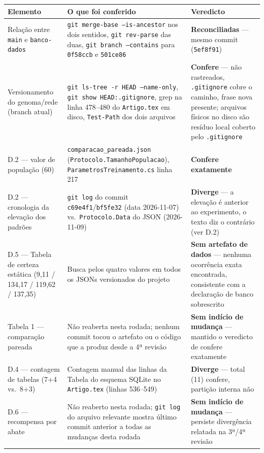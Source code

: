 \documentclass[11pt,a4paper]{article}
\begin{document}
\begin{longtable}{|p{3.6cm}|p{6.6cm}|p{4.4cm}|}
\hline
\textbf{Elemento} & \textbf{O que foi conferido} & \textbf{Veredicto} \\
\hline
\endhead
Relação entre \texttt{main} e \texttt{banco-dados} & \texttt{git merge-base --is-ancestor} nos dois
sentidos, \texttt{git rev-parse} das duas, \texttt{git branch --contains} para \texttt{0f58ccb} e
\texttt{501ce86} & \textbf{Reconciliadas} --- mesmo commit (\texttt{5ef8f91}) \\
\hline
Versionamento do genoma/rede (branch atual) & \texttt{git ls-tree -r HEAD --name-only}, \texttt{git
show HEAD:.gitignore}, grep na linha 478--480 do \texttt{Artigo.tex} em disco, \texttt{Test-Path} dos
dois arquivos & \textbf{Confere} --- não rastreados, \texttt{.gitignore} cobre o caminho, frase nova
presente; arquivos físicos no disco são resíduo local coberto pelo \texttt{.gitignore} \\
\hline
D.2 --- valor de população (60) & \texttt{comparacao\_pareada.json}
(\texttt{Protocolo.TamanhoPopulacao}), \texttt{ParametrosTreinamento.cs} linha 217 & \textbf{Confere
exatamente} \\
\hline
D.2 --- cronologia da elevação dos padrões & \texttt{git log} do commit \texttt{c69e4f1}/\texttt{bf5fe32}
(data 2026-11-07) vs.\ \texttt{Protocolo.Data} do JSON (2026-11-09) & \textbf{Diverge} --- a elevação é
anterior ao experimento, o texto diz o contrário (ver D.2) \\
\hline
D.5 --- Tabela de certeza estática (9,11 / 134,17 / 119,62 / 137,35) & Busca pelos quatro valores em
todos os JSONs versionados do projeto & \textbf{Sem artefato de dados} --- nenhuma ocorrência exata
encontrada, consistente com a declaração de banco sobrescrito \\
\hline
Tabela 1 --- comparação pareada & Não reaberta nesta rodada; nenhum commit tocou o artefato ou o
código que a produz desde a 4ª revisão & \textbf{Sem indício de mudança} --- mantido o veredicto de
confere exatamente \\
\hline
D.4 --- contagem de tabelas (7+4 vs.\ 8+3) & Contagem manual das linhas da Tabela do esquema SQLite no
\texttt{Artigo.tex} (linhas 536--549) & \textbf{Diverge} --- total (11) confere, partição interna não
\\
\hline
D.6 --- recompensa por abate & Não reaberto nesta rodada; \texttt{git log} do arquivo relevante mostra
último commit anterior a todas as mudanças desta rodada & \textbf{Sem indício de mudança} --- persiste
divergência relatada na 3ª/4ª revisão \\
\hline
\end{longtable}
\end{document}
